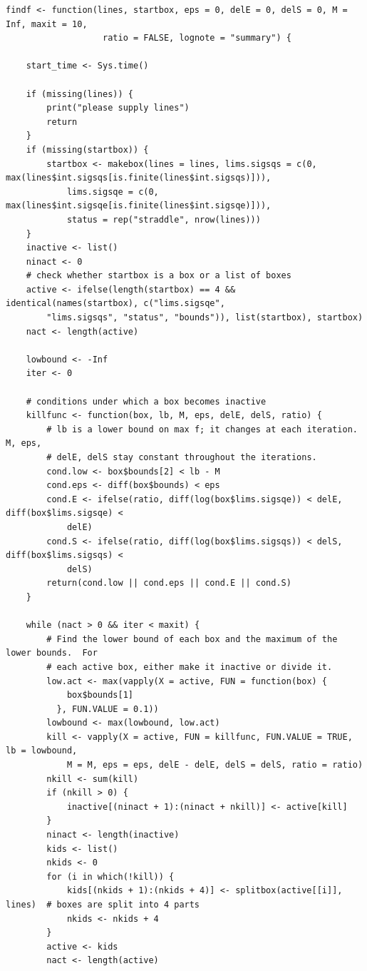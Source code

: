 \documentclass[ejs]{imsart}
\begin{document}
\begin{verbatim}
findf <- function(lines, startbox, eps = 0, delE = 0, delS = 0, M = Inf, maxit = 10,
                   ratio = FALSE, lognote = "summary") {

    start_time <- Sys.time()

    if (missing(lines)) {
        print("please supply lines")
        return
    }
    if (missing(startbox)) {
        startbox <- makebox(lines = lines, lims.sigsqs = c(0, max(lines$int.sigsqs[is.finite(lines$int.sigsqs)])),
            lims.sigsqe = c(0, max(lines$int.sigsqe[is.finite(lines$int.sigsqe)])),
            status = rep("straddle", nrow(lines)))
    }
    inactive <- list()
    ninact <- 0
    # check whether startbox is a box or a list of boxes
    active <- ifelse(length(startbox) == 4 && identical(names(startbox), c("lims.sigsqe",
        "lims.sigsqs", "status", "bounds")), list(startbox), startbox)
    nact <- length(active)

    lowbound <- -Inf
    iter <- 0

    # conditions under which a box becomes inactive
    killfunc <- function(box, lb, M, eps, delE, delS, ratio) {
        # lb is a lower bound on max f; it changes at each iteration. M, eps,
        # delE, delS stay constant throughout the iterations.
        cond.low <- box$bounds[2] < lb - M
        cond.eps <- diff(box$bounds) < eps
        cond.E <- ifelse(ratio, diff(log(box$lims.sigsqe)) < delE, diff(box$lims.sigsqe) <
            delE)
        cond.S <- ifelse(ratio, diff(log(box$lims.sigsqs)) < delS, diff(box$lims.sigsqs) <
            delS)
        return(cond.low || cond.eps || cond.E || cond.S)
    }

    while (nact > 0 && iter < maxit) {
        # Find the lower bound of each box and the maximum of the lower bounds.  For
        # each active box, either make it inactive or divide it.
        low.act <- max(vapply(X = active, FUN = function(box) {
            box$bounds[1]
          }, FUN.VALUE = 0.1))
        lowbound <- max(lowbound, low.act)
        kill <- vapply(X = active, FUN = killfunc, FUN.VALUE = TRUE, lb = lowbound,
            M = M, eps = eps, delE - delE, delS = delS, ratio = ratio)
        nkill <- sum(kill)
        if (nkill > 0) {
            inactive[(ninact + 1):(ninact + nkill)] <- active[kill]
        }
        ninact <- length(inactive)
        kids <- list()
        nkids <- 0
        for (i in which(!kill)) {
            kids[(nkids + 1):(nkids + 4)] <- splitbox(active[[i]], lines)  # boxes are split into 4 parts
            nkids <- nkids + 4
        }
        active <- kids
        nact <- length(active)


\end{verbatim}
\end{document}
